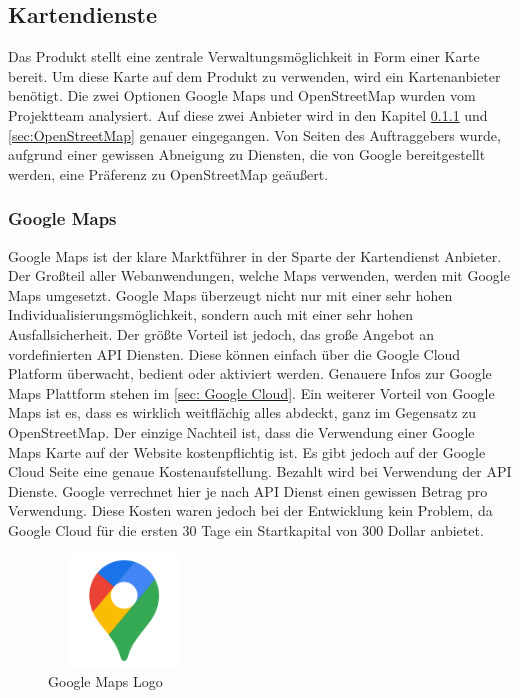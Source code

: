 \subsection{Kartendienste}
Das Produkt stellt eine zentrale Verwaltungsmöglichkeit in Form einer Karte bereit. Um diese Karte auf dem Produkt zu verwenden, wird ein Kartenanbieter benötigt. Die zwei Optionen Google Maps und OpenStreetMap wurden vom Projektteam analysiert. Auf diese zwei Anbieter wird in den Kapitel \ref{sec:Gooogle Map} und \ref{sec:OpenStreetMap} genauer eingegangen. Von Seiten des Auftraggebers wurde, aufgrund einer gewissen Abneigung zu Diensten, die von Google bereitgestellt werden, eine Präferenz zu OpenStreetMap geäußert.

\subsubsection{Google Maps} \label{sec:Gooogle Map}


Google Maps ist der klare Marktführer in der Sparte der Kartendienst Anbieter.  Der Großteil  aller Webanwendungen, welche Maps verwenden, werden mit Google Maps umgesetzt. Google Maps überzeugt nicht nur mit einer sehr hohen Individualisierungsmöglichkeit, sondern auch mit einer sehr hohen Ausfallsicherheit. Der größte Vorteil ist jedoch, das große Angebot an vordefinierten API Diensten. Diese können einfach über die Google Cloud Platform überwacht, bedient oder aktiviert werden. Genauere Infos zur Google Maps Plattform stehen im  \autoref{sec: Google Cloud}. Ein weiterer Vorteil von Google Maps ist es, dass es wirklich weitflächig alles abdeckt, ganz im Gegensatz zu OpenStreetMap. Der einzige Nachteil ist, dass die Verwendung einer Google Maps Karte auf der Website kostenpflichtig ist. Es gibt jedoch auf der Google Cloud Seite eine genaue Kostenaufstellung. Bezahlt wird bei Verwendung der API Dienste. Google verrechnet hier je nach API Dienst einen gewissen Betrag pro Verwendung. Diese Kosten waren jedoch bei der Entwicklung kein Problem, da Google Cloud für die ersten 30 Tage ein Startkapital von 300 Dollar anbietet.  
\begin{figure}[h]
	\centering
	\includegraphics[height=3cm,width=4cm]{images/GoogleMapsLogo}
	\caption{Google Maps Logo}
	\label{fig:GoogleMaps Logo}
\end{figure}
\newpage
